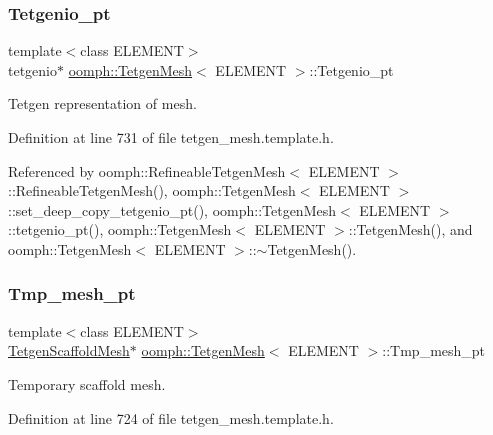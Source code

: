 \subsubsection{\texorpdfstring{Tetgenio\+\_\+pt}{Tetgenio\_pt}}
{\footnotesize\ttfamily template$<$class E\+L\+E\+M\+E\+NT$>$ \\
tetgenio$\ast$ \hyperlink{classoomph_1_1TetgenMesh}{oomph\+::\+Tetgen\+Mesh}$<$ E\+L\+E\+M\+E\+NT $>$\+::Tetgenio\+\_\+pt\hspace{0.3cm}{\ttfamily [protected]}}



Tetgen representation of mesh. 



Definition at line 731 of file tetgen\+\_\+mesh.\+template.\+h.



Referenced by oomph\+::\+Refineable\+Tetgen\+Mesh$<$ E\+L\+E\+M\+E\+N\+T $>$\+::\+Refineable\+Tetgen\+Mesh(), oomph\+::\+Tetgen\+Mesh$<$ E\+L\+E\+M\+E\+N\+T $>$\+::set\+\_\+deep\+\_\+copy\+\_\+tetgenio\+\_\+pt(), oomph\+::\+Tetgen\+Mesh$<$ E\+L\+E\+M\+E\+N\+T $>$\+::tetgenio\+\_\+pt(), oomph\+::\+Tetgen\+Mesh$<$ E\+L\+E\+M\+E\+N\+T $>$\+::\+Tetgen\+Mesh(), and oomph\+::\+Tetgen\+Mesh$<$ E\+L\+E\+M\+E\+N\+T $>$\+::$\sim$\+Tetgen\+Mesh().

\mbox{\label{classoomph_1_1TetgenMesh_ac11e90fcf927bbf8317800db7723bad2}} 
\subsubsection{\texorpdfstring{Tmp\+\_\+mesh\+\_\+pt}{Tmp\_mesh\_pt}}
{\footnotesize\ttfamily template$<$class E\+L\+E\+M\+E\+NT$>$ \\
\hyperlink{classoomph_1_1TetgenScaffoldMesh}{Tetgen\+Scaffold\+Mesh}$\ast$ \hyperlink{classoomph_1_1TetgenMesh}{oomph\+::\+Tetgen\+Mesh}$<$ E\+L\+E\+M\+E\+NT $>$\+::Tmp\+\_\+mesh\+\_\+pt\hspace{0.3cm}{\ttfamily [protected]}}



Temporary scaffold mesh. 



Definition at line 724 of file tetgen\+\_\+mesh.\+template.\+h.




